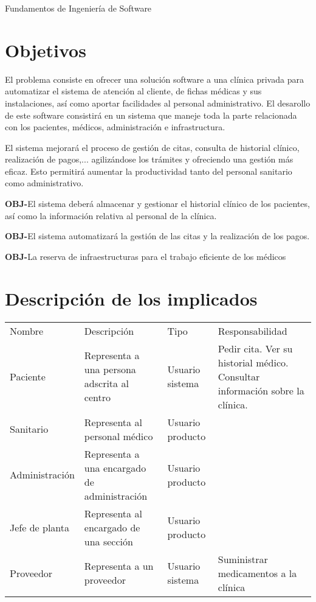 \documentclass[11pt,a4paper]{article}
\newcounter{ObjCounter}
\newcommand{\obj}[1]{\addtocounter{ObjCounter}{1}\textbf{\rmfamily OBJ-\theObjCounter}\quad#1\\}
\begin{document}
{\Huge{Fundamentos de Ingeniería de Software}}

\section{Objetivos} %
\label{sec:estudio_del_dominio_del_problema}

El problema consiste en ofrecer una solución software a una clínica privada para automatizar el sistema de atención al cliente, de fichas médicas y sus instalaciones, así como aportar facilidades al personal administrativo. El desarollo de este software consistirá en un sistema que maneje toda la parte relacionada con los pacientes, médicos, administración e infrastructura.

El sistema mejorará el proceso de gestión de citas, consulta de historial clínico, realización de pagos,... agilizándose los trámites y ofreciendo una gestión más eficaz. Esto permitirá aumentar la productividad tanto del personal sanitario como administrativo.

\obj{El sistema deberá almacenar y gestionar el historial clínico de  los pacientes, así como la información relativa al personal de la clínica.}
\obj{El sistema automatizará la gestión de las citas y la realización de los pagos.}
\obj{La reserva de infraestructuras para el trabajo eficiente de los médicos}

\section{Descripción de los implicados} %
\label{sec:descripción_de_los_implicados}

	\begin{tabular}{lp{3cm}lp{4cm}}
		Nombre & Descripción & Tipo & Responsabilidad \\
		Paciente & Representa a una persona adscrita al centro & Usuario sistema & Pedir cita. Ver su historial médico. Consultar información sobre la clínica. \\
		Sanitario & Representa al personal médico & Usuario producto & \\
		Administración & Representa a una encargado de administración & Usuario producto & \\
		Jefe de planta & Representa al encargado de una sección & Usuario producto & \\
		Proveedor & Representa a un proveedor & Usuario sistema & Suministrar medicamentos a la clínica
	\end{tabular}
\end{document}
